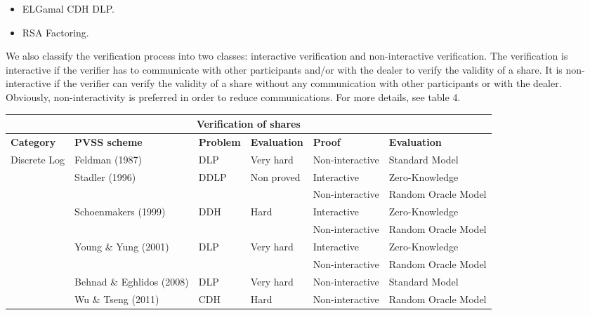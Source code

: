 \documentclass[submission,copyright,creativecommons]{eptcs}
\begin{document}
\begin{itemize}
\item ELGamal  CDH  DLP.
\item RSA Factoring.
\end{itemize}

We also classify the verification process into two classes: interactive
verification and non-interactive verification. The verification is
interactive if the verifier has to communicate with other participants
and/or with the dealer to verify the validity of a share. It is
non-interactive if the verifier can verify the validity of a share without
any communication with other participants or with the dealer. Obviously,
non-interactivity is preferred in order to reduce communications. For more
details, see table 4.

\begin{table*}[tbp] \centering \begin{tabular}{|p{2.5cm}||p{3cm}||p{1.5cm}||p{1.7cm}||p{1.6cm}||p{1.7cm}|}
\hline
\multicolumn{6}{|c|}{\textbf{Verification of shares}} \\ \hline
\textbf{Category} & \textbf{PVSS scheme} & \textbf{Problem} & \textbf{Evaluation} & \textbf{Proof} & \textbf{Evaluation} \\ \hline
\multirow{8}{2.5cm}{Discrete Log} & Feldman (1987) & DLP & Very hard & Non-interactive
& Standard Model \\ \cline{2-4}\cline{2-6}
& \multirow{2}{2.5cm}{Stadler (1996)} & \multirow{2}{*}{DDLP} & \multirow{2}{*}{Non proved} & 
Interactive & Zero-Knowledge \\ \cline{5-6}
&  &  &  & Non-interactive & Random Oracle Model \\ \cline{2-4}\cline{2-6}
& \multirow{2}{3cm}{Schoenmakers (1999)} & \multirow{2}{*}{DDH} & \multirow{2}{*}{Hard} & 
Interactive & Zero-Knowledge \\ \cline{5-6}
&  &  &  & Non-interactive & Random Oracle Model \\ \cline{2-4}\cline{2-6}
& \multirow{2}{3cm}{Young \& Yung (2001)} & \multirow{2}{*}{DLP} & \multirow{2}{*}{Very hard} & 
Interactive & Zero-Knowledge \\ \cline{5-6}
&  &  &  & Non-interactive & Random Oracle Model \\ \cline{2-4}\cline{2-6}
& Behnad \& Eghlidos (2008) & DLP & Very hard & Non-interactive & Standard
Model \\ \cline{2-6}
& Wu \& Tseng (2011) & CDH & Hard & Non-interactive & Random Oracle Model \\ 

\end{tabular}
\end{table*}
\end{document}
